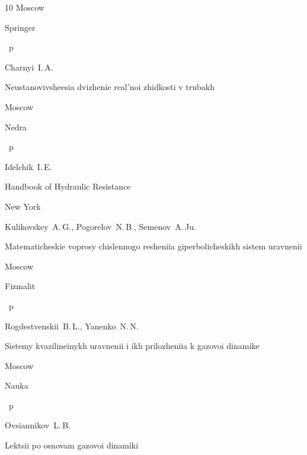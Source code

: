 \begin{thebibliography}{10}
\publaddr Moscow

\publ  Springer


~p






\by 	Charnyi~I.\,A. 

\book Neustanovivsheesia dvizhenie real'noi zhidkosti v trubakh

\publaddr Moscow

\publ Nedra


~p






\by 	Idelchik~I.\,E.

\book Handbook of Hydraulic Resistance

\publaddr New York









\by 	Kulikovskey~A.\,G., Pogorelov~N.\,B., Semenov~A.\,Ju. 

\book Matematicheskie voprosy chislennogo resheniia giperbolicheskikh sistem uravnenii

\publaddr Moscow

\publ Fizmalit


~p




\by 	Rogdestvenskii~B.\,L., Yanenko~N.\,N. 

\book Sistemy kvazilineinykh uravnenii i ikh prilozheniia k gazovoi dinamike

\publaddr Moscow

\publ Nauka


~p






\by 	Ovsiannikov~L.\,B.

\book Lektsii po osnovam gazovoi dinamiki


\end{thebibliography}
